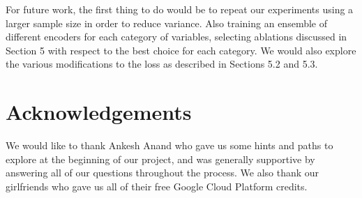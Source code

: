 \documentclass{article}
\begin{document}
For future work, the first thing to do would be to repeat our experiments using a larger sample size in order to reduce variance. Also training an ensemble of different encoders for each category of variables, selecting ablations discussed in Section 5 with respect to the best choice for each category. We would also explore the various modifications to the loss as described in Sections 5.2 and 5.3.

\section{Acknowledgements}
We would like to thank Ankesh Anand who gave us some hints and paths to explore at the beginning of our project, and was generally supportive by answering all of our questions throughout the process. We also thank our girlfriends who gave us all of their free Google Cloud Platform credits.



\end{document}
